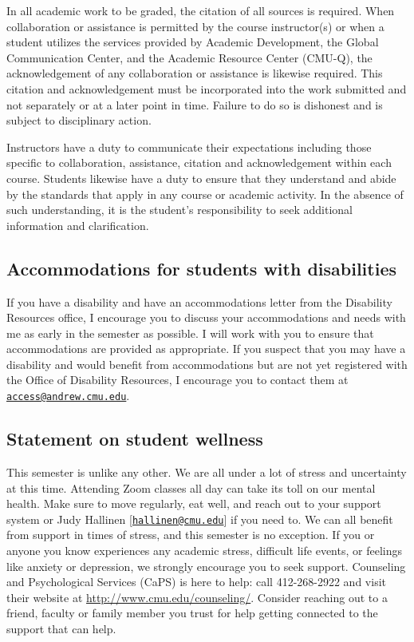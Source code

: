 \documentclass{article}
\begin{document}
In all academic work to be graded, the citation of all sources is required. When
collaboration or assistance is permitted by the course instructor(s) or when a
student utilizes the services provided by Academic Development, the Global
Communication Center, and the Academic Resource Center (CMU-Q), the
acknowledgement of any collaboration or assistance is likewise required. This
citation and acknowledgement must be incorporated into the work submitted and
not separately or at a later point in time. Failure to do so is dishonest and is
subject to disciplinary action.

Instructors have a duty to communicate their expectations including those
specific to collaboration, assistance, citation and acknowledgement within each
course. Students likewise have a duty to ensure that they understand and abide
by the standards that apply in any course or academic activity. In the absence
of such understanding, it is the student’s responsibility to seek additional
information and clarification.

\subsection*{Accommodations for students with disabilities}

If you have a disability and have an accommodations letter from the Disability
Resources office, I encourage you to discuss your accommodations and needs with
me as early in the semester as possible. I will work with you to ensure that
accommodations are provided as appropriate. If you suspect that you may have a
disability and would benefit from accommodations but are not yet registered with
the Office of Disability Resources, I encourage you to contact them at
\href{mailto:access@andrew.cmu.edu}{\texttt{access@andrew.cmu.edu}}.


\subsection*{Statement on student wellness}

This semester is unlike any other. We are all under a lot of stress and
uncertainty at this time. Attending Zoom classes all day can take its toll on
our mental health. Make sure to move regularly, eat well, and reach out to your
support system or Judy Hallinen
[\href{mailto:hallinen@cmu.edu}{\texttt{hallinen@cmu.edu}}] if you need to. We
can all benefit from support in times of stress, and this semester is no
exception. If you or anyone you know experiences any academic stress, difficult
life events, or feelings like anxiety or depression, we strongly encourage you
to seek support. Counseling and Psychological Services (CaPS) is here to help:
call 412-268-2922 and visit their website at
\url{http://www.cmu.edu/counseling/}. Consider reaching out to a friend, faculty
or family member you trust for help getting connected to the support that can
help.
\end{document}
